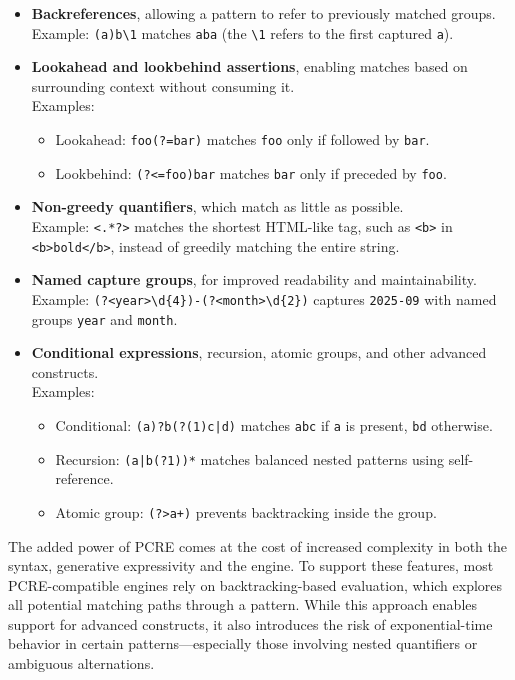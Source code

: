 \begin{itemize}
	\item \textbf{Backreferences}, allowing a pattern to refer to previously matched groups.\\
	Example: \texttt{(a)b\textbackslash1} matches \texttt{aba} (the \texttt{\textbackslash1} refers to the first captured \texttt{a}).
	
	\item \textbf{Lookahead and lookbehind assertions}, enabling matches based on surrounding context without consuming it.\\
	Examples:
	\begin{itemize}
		\item Lookahead: \texttt{foo(?=bar)} matches \texttt{foo} only if followed by \texttt{bar}.
		\item Lookbehind: \texttt{(?<=foo)bar} matches \texttt{bar} only if preceded by \texttt{foo}.
	\end{itemize}
	
	\item \textbf{Non-greedy quantifiers}, which match as little as possible.\\
	Example: \texttt{<.*?>} matches the shortest HTML-like tag, such as \texttt{<b>} in \texttt{<b>bold</b>}, instead of greedily matching the entire string.
	
	\item \textbf{Named capture groups}, for improved readability and maintainability.\\
	Example: \texttt{(?<year>\textbackslash d\{4\})-(?<month>\textbackslash d\{2\})} captures \texttt{2025-09} with named groups \texttt{year} and \texttt{month}.
	
	\item \textbf{Conditional expressions}, recursion, atomic groups, and other advanced constructs.\\
	Examples:
	\begin{itemize}
		\item Conditional: \texttt{(a)?b(?(1)c|d)} matches \texttt{abc} if \texttt{a} is present, \texttt{bd} otherwise.
		\item Recursion: \texttt{(a|b(?1))*} matches balanced nested patterns using self-reference.
		\item Atomic group: \texttt{(?>a+)} prevents backtracking inside the group.
	\end{itemize}
\end{itemize}

The added power of PCRE comes at the cost of increased complexity in both the syntax, generative expressivity and the engine. To support these features, most PCRE-compatible engines rely on backtracking-based evaluation, which explores all potential matching paths through a pattern. While this approach enables support for advanced constructs, it also introduces the risk of exponential-time behavior in certain patterns—especially those involving nested quantifiers or ambiguous alternations.



